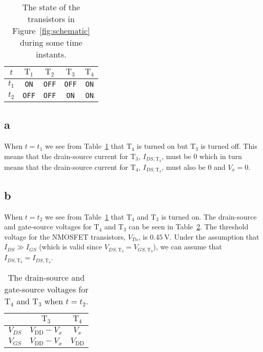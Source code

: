 \documentclass[12pt,a4paper]{article}
\begin{document}
\begin{table}[!ht]
  \centering
  \caption{The state of the transistors in Figure~\ref{fig:schematic} during some time instants.}
  \begin{tabular}{|c|c|c|c|c|}\hline
    $t$ & $\text{T}_1$ & $\text{T}_2$ & $\text{T}_3$ & $\text{T}_4$ \\\hline
    $t_1$ & \texttt{ON} & \texttt{OFF} & \texttt{OFF} & \texttt{ON} \\\hline
    $t_2$ & \texttt{OFF} & \texttt{OFF} & \texttt{ON} & \texttt{ON} \\\hline
  \end{tabular}
  \label{tab:transistors}
\end{table}

\subsection{a}
When $t=t_1$ we see from Table~\ref{tab:transistors} that $\text{T}_4$ is turned on but $\text{T}_3$ is turned off.
This means that the drain-source current for $\text{T}_3$, $I_{DS,\text{T}_3}$, must be 0 which in turn means that the drain-source current for $\text{T}_4$, $I_{DS,\text{T}_4}$, must also be 0 and $V_x=0$.

\subsection{b}
When $t=t_2$ we see from Table~\ref{tab:transistors} that $\text{T}_4$ and $\text{T}_3$ is turned on.
The drain-source and gate-source voltages for $\text{T}_4$ and $\text{T}_3$ can be seen in Table~\ref{tab:volt}.
The threshold voltage for the NMOSFET transistors, $V_{Tn}$, is $\SI{0.45}{\volt}$.
Under the assumption that $I_{DS} \gg I_{GS}$ (which is valid since $V_{DS,\text{T}_3} = V_{GS,\text{T}_3}$), we can assume that $I_{DS,\text{T}_3} = I_{DS,\text{T}_4}$.

\begin{table}[!ht]
  \centering
  \caption{The drain-source and gate-source voltages for $\text{T}_4$ and $\text{T}_3$ when $t=t_2$.}
  \begin{tabular}{|c|c|c|}\hline
     & $\text{T}_3$ & $\text{T}_4$ \\\hline
    $V_{DS}$ & $V_{\text{DD}} - V_x$ & $V_x$ \\\hline
    $V_{GS}$ & $V_{\text{DD}} - V_x$ & $V_{\text{DD}}$ \\\hline
  \end{tabular}
  \label{tab:volt}
\end{table}
\end{document}
